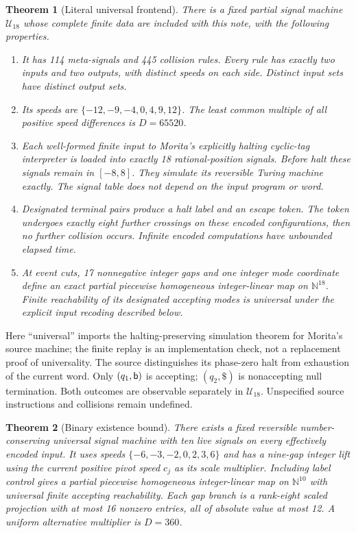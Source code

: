 \documentclass[11pt,letterpaper]{article}
\numberwithin{equation}{section}
\newtheorem{theorem}{Theorem}[section]
\theoremstyle{definition}
\theoremstyle{remark}
\newcommand{\NN}{\mathbb N}
\newcommand{\lab}[1]{\mathsf{#1}}\newcommand{\diag}{\operatorname{diag}}
\begin{document}
\begin{theorem}[Literal universal frontend]\label{smc:cs:thm:literal}
There is a fixed partial signal machine $\mathcal U_{18}$ whose complete finite data are included with this note, with the following properties.
\begin{enumerate}[label=(\roman*)]
\item It has 114 meta-signals and 445 collision rules. Every rule has exactly two inputs and two outputs, with distinct speeds on each side. Distinct input sets have distinct output sets.
\item Its speeds are $\{-12,-9,-4,0,4,9,12\}$. The least common multiple of all positive speed differences is $D=65520$.
\item Each well-formed finite input to Morita's explicitly halting cyclic-tag interpreter is loaded into exactly 18 rational-position signals. Before halt these signals remain in $[-8,8]$. They simulate its reversible Turing machine exactly. The signal table does not depend on the input program or word.
\item Designated terminal pairs produce a halt label and an escape token. The token undergoes exactly eight further crossings on these encoded configurations, then no further collision occurs. Infinite encoded computations have unbounded elapsed time.
\item At event cuts, 17 nonnegative integer gaps and one integer mode coordinate define an exact partial piecewise homogeneous integer-linear map on $\NN^{18}$. Finite reachability of its designated accepting modes is universal under the explicit input recoding described below.
\end{enumerate}
\end{theorem}

Here ``universal'' imports the halting-preserving simulation theorem for Morita's source machine; the finite replay is an implementation check, not a replacement proof of universality. The source distinguishes its phase-zero halt from exhaustion of the current word. Only $(q_1,\mathsf b)$ is accepting; $(q_2,\lab\$)$ is nonaccepting null termination. Both outcomes are observable separately in $\mathcal U_{18}$. Unspecified source instructions and collisions remain undefined.

\begin{theorem}[Binary existence bound]\label{smc:cs:thm:binary}
There exists a fixed reversible number-conserving universal signal machine with ten live signals on every effectively encoded input. It uses speeds $\{-6,-3,-2,0,2,3,6\}$ and has a nine-gap integer lift using the current positive pivot speed $c_j$ as its scale multiplier. Including label control gives a partial piecewise homogeneous integer-linear map on $\NN^{10}$ with universal finite accepting reachability. Each gap branch is a rank-eight scaled projection with at most 16 nonzero entries, all of absolute value at most 12. A uniform alternative multiplier is $D=360$.
\end{theorem}
\end{document}
